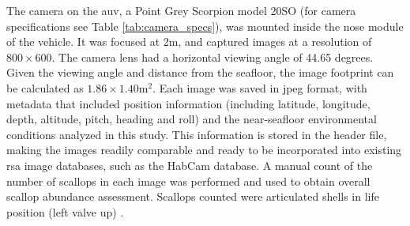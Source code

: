 \documentclass {udthesis}
\begin{document}
The camera on the \gls{auv}, a Point Grey Scorpion model 20SO (for camera specifications see Table \ref{tab:camera_specs}), 
was mounted inside the nose module of the vehicle.
It was focused at 2\;m, and captured
images at a resolution of $800\times600$.  The camera lens had a horizontal viewing 
angle of 44.65 degrees.  Given the viewing angle and distance from the seafloor, 
the image footprint can be calculated as $1.86\times1.40$\;m$^2$.
Each image was saved in jpeg format, with metadata that included position information 
(including latitude, longitude, depth, altitude, pitch, heading and roll)  
and the near-seafloor environmental conditions analyzed in this study.  
This information is stored in the header file, making the images readily comparable and 
ready to be incorporated into existing \gls{rsa} image databases, such as the 
HabCam database.
A manual count of the number of scallops in each image was performed and used to obtain overall scallop
abundance assessment.
Scallops counted were articulated shells in life position (left valve up) \cite{walker}.
%
\end{document}

